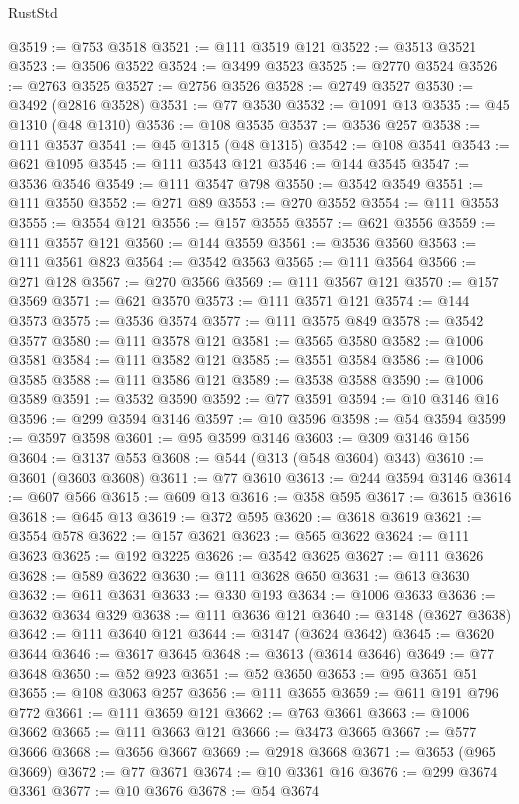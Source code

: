 \begin{lexlean}{RustStd}
\begin{coremodule}
@3519 := @753 @3518
@3521 := @111 @3519 @121
@3522 := @3513 @3521
@3523 := @3506 @3522
@3524 := @3499 @3523
@3525 := @2770 @3524
@3526 := @2763 @3525
@3527 := @2756 @3526
@3528 := @2749 @3527
@3530 := @3492 (@2816 @3528)
@3531 := @77 @3530
@3532 := @1091 @13
@3535 := @45 @1310 (@48 @1310)
@3536 := @108 @3535
@3537 := @3536 @257
@3538 := @111 @3537
@3541 := @45 @1315 (@48 @1315)
@3542 := @108 @3541
@3543 := @621 @1095
@3545 := @111 @3543 @121
@3546 := @144 @3545
@3547 := @3536 @3546
@3549 := @111 @3547 @798
@3550 := @3542 @3549
@3551 := @111 @3550
@3552 := @271 @89
@3553 := @270 @3552
@3554 := @111 @3553
@3555 := @3554 @121
@3556 := @157 @3555
@3557 := @621 @3556
@3559 := @111 @3557 @121
@3560 := @144 @3559
@3561 := @3536 @3560
@3563 := @111 @3561 @823
@3564 := @3542 @3563
@3565 := @111 @3564
@3566 := @271 @128
@3567 := @270 @3566
@3569 := @111 @3567 @121
@3570 := @157 @3569
@3571 := @621 @3570
@3573 := @111 @3571 @121
@3574 := @144 @3573
@3575 := @3536 @3574
@3577 := @111 @3575 @849
@3578 := @3542 @3577
@3580 := @111 @3578 @121
@3581 := @3565 @3580
@3582 := @1006 @3581
@3584 := @111 @3582 @121
@3585 := @3551 @3584
@3586 := @1006 @3585
@3588 := @111 @3586 @121
@3589 := @3538 @3588
@3590 := @1006 @3589
@3591 := @3532 @3590
@3592 := @77 @3591
@3594 := @10 @3146 @16
@3596 := @299 @3594 @3146
@3597 := @10 @3596
@3598 := @54 @3594
@3599 := @3597 @3598
@3601 := @95 @3599 @3146
@3603 := @309 @3146 @156
@3604 := @3137 @553
@3608 := @544 (@313 (@548 @3604) @343)
@3610 := @3601 (@3603 @3608)
@3611 := @77 @3610
@3613 := @244 @3594 @3146
@3614 := @607 @566
@3615 := @609 @13
@3616 := @358 @595
@3617 := @3615 @3616
@3618 := @645 @13
@3619 := @372 @595
@3620 := @3618 @3619
@3621 := @3554 @578
@3622 := @157 @3621
@3623 := @565 @3622
@3624 := @111 @3623
@3625 := @192 @3225
@3626 := @3542 @3625
@3627 := @111 @3626
@3628 := @589 @3622
@3630 := @111 @3628 @650
@3631 := @613 @3630
@3632 := @611 @3631
@3633 := @330 @193
@3634 := @1006 @3633
@3636 := @3632 @3634 @329
@3638 := @111 @3636 @121
@3640 := @3148 (@3627 @3638)
@3642 := @111 @3640 @121
@3644 := @3147 (@3624 @3642)
@3645 := @3620 @3644
@3646 := @3617 @3645
@3648 := @3613 (@3614 @3646)
@3649 := @77 @3648
@3650 := @52 @923
@3651 := @52 @3650
@3653 := @95 @3651 @51
@3655 := @108 @3063 @257
@3656 := @111 @3655
@3659 := @611 @191 @796 @772
@3661 := @111 @3659 @121
@3662 := @763 @3661
@3663 := @1006 @3662
@3665 := @111 @3663 @121
@3666 := @3473 @3665
@3667 := @577 @3666
@3668 := @3656 @3667
@3669 := @2918 @3668
@3671 := @3653 (@965 @3669)
@3672 := @77 @3671
@3674 := @10 @3361 @16
@3676 := @299 @3674 @3361
@3677 := @10 @3676
@3678 := @54 @3674

\end{coremodule}
\end{lexlean}
